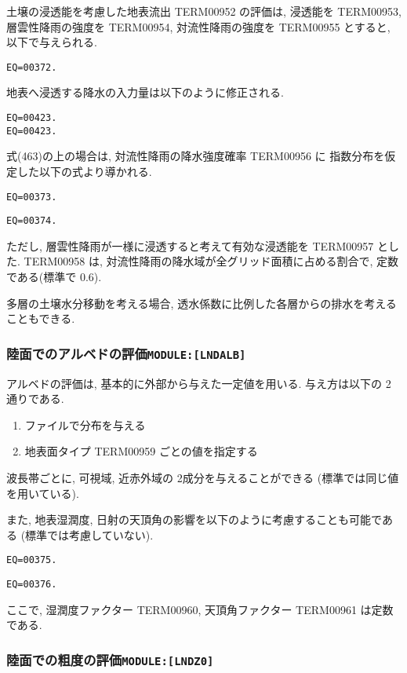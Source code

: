 土壌の浸透能を考慮した地表流出 TERM00952 の評価は, 浸透能を TERM00953, 
層雲性降雨の強度を TERM00954, 対流性降雨の強度を TERM00955 とすると, 
以下で与えられる. 
\begin{verbatim}
EQ=00372.
\end{verbatim}
地表へ浸透する降水の入力量は以下のように修正される. 
\begin{verbatim}
EQ=00423.
EQ=00423.
\end{verbatim}
式(463)の上の場合は, 対流性降雨の降水強度確率 TERM00956 に
指数分布を仮定した以下の式より導かれる. 
\begin{verbatim}
EQ=00373.
\end{verbatim}
\begin{verbatim}
EQ=00374.
\end{verbatim}
ただし, 層雲性降雨が一様に浸透すると考えて有効な浸透能を
TERM00957 とした. 
TERM00958 は, 対流性降雨の降水域が全グリッド面積に占める割合で, 
定数である(標準で 0.6). 

多層の土壌水分移動を考える場合, 
透水係数に比例した各層からの排水を考えることもできる. 

\subsubsection{陸面でのアルベドの評価\texttt{MODULE:[LNDALB]}}

アルベドの評価は, 基本的に外部から与えた一定値を用いる. 
与え方は以下の 2通りである. 
\begin{enumerate}
    \item ファイルで分布を与える
    \item 地表面タイプ TERM00959 ごとの値を指定する
\end{enumerate}

波長帯ごとに, 可視域, 近赤外域の 2成分を与えることができる
(標準では同じ値を用いている). 

また, 地表湿潤度, 日射の天頂角の影響を以下のように考慮することも可能である
(標準では考慮していない). 
\begin{verbatim}
EQ=00375.
\end{verbatim}
\begin{verbatim}
EQ=00376.
\end{verbatim}
ここで, 湿潤度ファクター TERM00960, 天頂角ファクター TERM00961 は定数である. 

\subsubsection{陸面での粗度の評価\texttt{MODULE:[LNDZ0]}}

